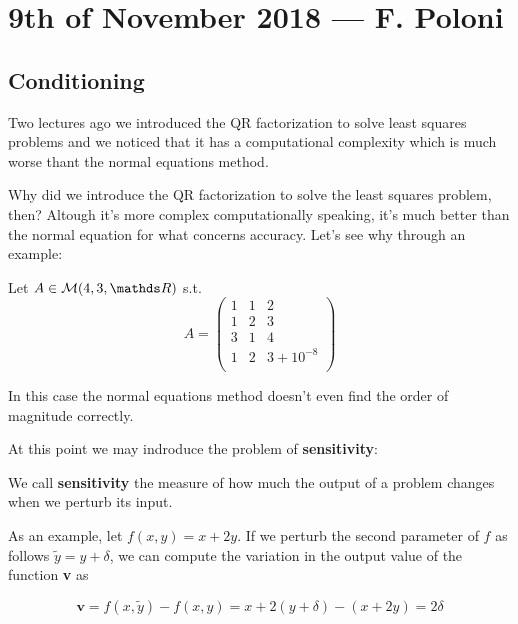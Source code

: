 \documentclass[computational_mathematics.tex]{subfiles}
\begin{document}
\section{9th of November 2018 --- F. Poloni}

\subsection{Conditioning}
Two lectures ago we introduced the QR factorization to solve least squares problems and we noticed that it has a computational complexity which is much worse thant the normal equations method.

Why did we introduce the QR factorization to solve the least squares problem, then? Altough it's more complex computationally speaking, it's much better than the normal equation for what concerns accuracy. Let's see why through an example:

 \begin{example}\label{ex:9nov1}
   Let $A \in \mathcal{M}(4, 3, \R)$ s.t.
   \[
  A = \begin{pmatrix}
    1&1&2\\
    1&2&3\\
    3&1&4\\
    1&2& 3 + 10^{-8}\\
  \end{pmatrix}
    \]

    In this case the normal equations method doesn't even find the order of magnitude correctly.
 \end{example}

    At this point we may indroduce the problem of \textbf{sensitivity}:

\begin{definition}[Sensitivity]
  We call \textbf{sensitivity} the measure of how much the output of a problem changes when we perturb its input.

  As an example, let $f(x, y) = x + 2y$. If we perturb the second parameter of $f$ as follows $\widetilde{y} = y + \delta$, we can compute the variation in the output value of the function \textbf{v} as
  
  \[
    \mathbf{v} = f(x, \widetilde{y}) - f(x, y) =  x + 2(y + \delta) - (x + 2y) = 2\delta
  \]

\end{definition}
\end{document}
